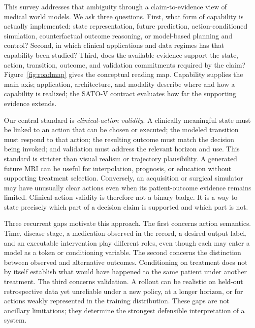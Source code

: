 This survey addresses that ambiguity through a claim-to-evidence view of medical world models. We ask three questions. First, what form of capability is actually implemented: state representation, future prediction, action-conditioned simulation, counterfactual outcome reasoning, or model-based planning and control? Second, in which clinical applications and data regimes has that capability been studied? Third, does the available evidence support the state, action, transition, outcome, and validation commitments required by the claim? Figure~\ref{fig:roadmap} gives the conceptual reading map. Capability supplies the main axis; application, architecture, and modality describe where and how a capability is realized; the SATO-V contract evaluates how far the supporting evidence extends.



Our central standard is \emph{clinical-action validity}. A clinically meaningful state must be linked to an action that can be chosen or executed; the modeled transition must respond to that action; the resulting outcome must match the decision being invoked; and validation must address the relevant horizon and use. This standard is stricter than visual realism or trajectory plausibility. A generated future MRI can be useful for interpolation, prognosis, or education without supporting treatment selection. Conversely, an acquisition or surgical simulator may have unusually clear actions even when its patient-outcome evidence remains limited. Clinical-action validity is therefore not a binary badge. It is a way to state precisely which part of a decision claim is supported and which part is not.

Three recurrent gaps motivate this approach. The first concerns action semantics. Time, disease stage, a medication observed in the record, a desired output label, and an executable intervention play different roles, even though each may enter a model as a token or conditioning variable. The second concerns the distinction between observed and alternative outcomes. Conditioning on treatment does not by itself establish what would have happened to the same patient under another treatment. The third concerns validation. A rollout can be realistic on held-out retrospective data yet unreliable under a new policy, at a longer horizon, or for actions weakly represented in the training distribution. These gaps are not ancillary limitations; they determine the strongest defensible interpretation of a system.

